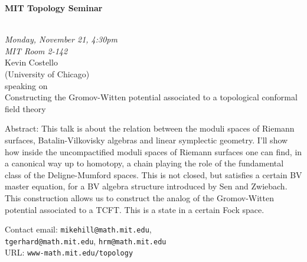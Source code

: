 \documentclass{slides}
\begin{document}
\begin{center}

{\fontsize {54pt}{40pt}\selectfont

\textrm{
{\textbf{MIT Topology Seminar}}}
}\\
\vspace{1cm}
{\large\textrm{\emph{Monday, November 21, 4:30pm\\MIT Room 2-142}}}\\
\vspace{1cm}
\textrm{{\LARGE Kevin Costello  \\[.5cm](University of Chicago)}}\\
\vspace{1cm} %
\textrm{speaking on}\\ %
\vspace{5mm}
\textrm{{\LARGE Constructing the Gromov-Witten potential associated to a topological conformal field theory }}\\
\end{center}
\vspace{1cm}
{\tiny
Abstract: This talk is about the relation between the moduli spaces of Riemann surfaces, Batalin-Vilkovisky algebras and linear symplectic geometry.  I'll show how inside the uncompactified moduli spaces of Riemann surfaces one can find, in a canonical way up to homotopy, a chain playing the role of the fundamental class of the Deligne-Mumford spaces.  This is not closed, but satisfies a certain BV master equation, for a BV algebra structure introduced by Sen and Zwiebach.  This construction allows us to construct the analog of the Gromov-Witten potential associated to a TCFT.  This is a state in a certain Fock space.

\textrm{Contact email: } \texttt{mikehill@math.mit.edu},\\
 \texttt{tgerhard@math.mit.edu},
\texttt{hrm@math.mit.edu}\\
\textrm{URL: } \texttt{www-math.mit.edu/topology}
}
\end{document}
